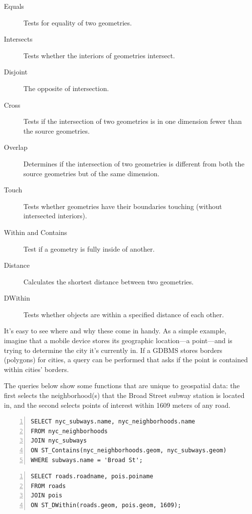 \begin{description}
  \item[Equals] Tests for equality of two geometries.
  \item[Intersects] Tests whether the interiors of geometries intersect.
  \item[Disjoint] The opposite of intersection.
  \item[Cross] Tests if the intersection of two geometries is in one dimension fewer than the source geometries.
  \item[Overlap] Determines if the intersection of two geometries is different from both the source geometries but of the same dimension.
  \item[Touch] Tests whether geometries have their boundaries touching (without intersected interiors).
  \item[Within and Contains] Test if a geometry is fully inside of another.
  \item[Distance] Calculates the shortest distance between two geometries.
  \item[DWithin] Tests whether objects are within a specified distance of each other.
\end{description}

It's easy to see where and why these come in handy. As a simple example, imagine that a mobile device stores its geographic location---a point---and is trying to determine the city it's currently in. If a GDBMS stores borders (polygons) for cities, a query can be performed that asks if the point is contained within cities' borders.


The queries below show some functions that are unique to geospatial data: the first selects the neighborhood(s) that the Broad Street subway station is located in, and the second selects points of interest within 1609 meters of any road.

\begin{Verbatim}[samepage=true,baselinestretch=1,numbers=left,xleftmargin=12mm]
SELECT nyc_subways.name, nyc_neighborhoods.name
FROM nyc_neighborhoods
JOIN nyc_subways
ON ST_Contains(nyc_neighborhoods.geom, nyc_subways.geom)
WHERE subways.name = 'Broad St';
\end{Verbatim}

\begin{Verbatim}[samepage=true,baselinestretch=1,numbers=left,xleftmargin=12mm]
SELECT roads.roadname, pois.poiname
FROM roads
JOIN pois 
ON ST_DWithin(roads.geom, pois.geom, 1609);
\end{Verbatim}

